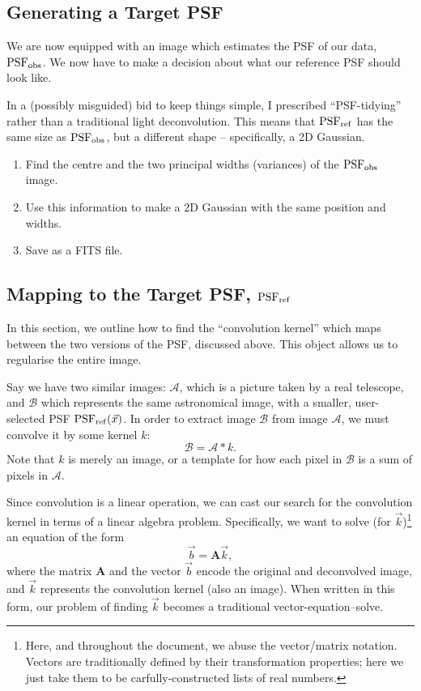 \documentclass[letterpaper, 11pt]{article}
\def\psfobs{\ensuremath{{\rm PSF_{obs}}}\xspace}
\def\psfref{\ensuremath{{\rm PSF_{ref}}}\xspace}
\begin{document}
\subsection{Generating a Target PSF}

We are now equipped with an image which estimates the PSF of our data, \psfobs. We now have to make a decision about what our reference PSF should look like.

In a (possibly misguided) bid to keep things simple, I prescribed ``PSF-tidying'' rather than a traditional light deconvolution. This means that \psfref has the same size as \psfobs, but a different shape -- specifically, a 2D Gaussian.
\begin{enumerate}
	\item Find the centre and the two principal widths (variances) of the \psfobs image.
	\item Use this information to make a 2D Gaussian with the same position and widths.
	\item Save as a FITS file.
\end{enumerate}


\subsection{Mapping to the Target PSF, \psfref}
\label{sec:kernel}

In this section, we outline how to find the ``convolution kernel'' which maps between the two versions of the PSF, discussed above. This object allows us to regularise the entire image.

Say we have two similar images: $\mathcal{A}$, which is a picture taken by a real telescope, and $\mathcal{B}$ which represents the same astronomical image, with a smaller, user-selected PSF $\psfref(\vec x)$. In order to extract image $\mathcal B$ from image $\mathcal A$, we must convolve it by some kernel $k$:
\begin{equation}
	\mathcal B = \mathcal A \ast k.
\end{equation}
Note that $k$ is merely an image, or a template for how each pixel in $\mathcal B$ is a sum of pixels in  $\mathcal A$.

Since convolution is a linear operation, we can cast our search for the convolution kernel in terms of a linear algebra problem. Specifically, we want to solve (for $\vec k$)\footnote{Here, and throughout the document, we abuse the vector/matrix notation. Vectors are traditionally defined by their transformation properties; here we just take them to be carfully-constructed lists of real numbers.} an equation of the form
\begin{equation}\label{eqn:vector}
	\vec b = \mathbf{A} \vec k,
\end{equation}
where the matrix $\mathbf{A}$ and the vector $\vec b$ encode the original and deconvolved image, and $\vec k$ represents the convolution kernel (also an image). When written in this form, our problem of finding $\vec k$ becomes a traditional vector-equation--solve.
\end{document}
